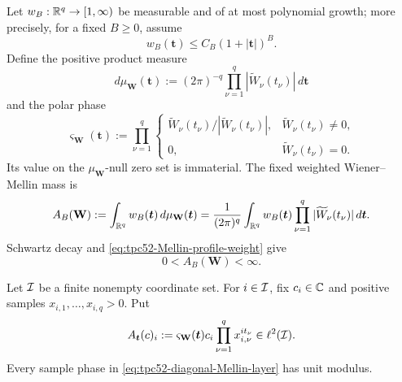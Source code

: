 Let \(w_B:\mathbb R^q\to[1,\infty)\) be measurable and of at most polynomial
growth; more precisely, for a fixed \(B\geq0\), assume
\begin{equation}
 w_B(\bm t)\leq C_B(1+|\bm t|)^B.
 \label{eq:tpc52-Mellin-profile-weight}
\end{equation}
Define the positive product measure
\begin{equation}
 d\mu_{\mathbf W}(\bm t)
 :=(2\pi)^{-q}\prod_{\nu=1}^q
       |\widetilde W_\nu(t_\nu)|\,d\bm t
 \label{eq:tpc52-Mellin-variation-measure}
\end{equation}
and the polar phase
\begin{equation}
 \varsigma_{\mathbf W}(\bm t)
 :=\prod_{\nu=1}^q
   \begin{cases}
    \widetilde W_\nu(t_\nu)/
       |\widetilde W_\nu(t_\nu)|,
       &\widetilde W_\nu(t_\nu)\ne0,\\
    0,&\widetilde W_\nu(t_\nu)=0.
   \end{cases}
 \label{eq:tpc52-Mellin-polar-phase}
\end{equation}
Its value on the \(\mu_{\mathbf W}\)-null zero set is immaterial.  The
fixed weighted Wiener--Mellin mass is
\begin{equation}
 A_B(\mathbf W)
 :=\int_{\mathbb R^q}w_B(\bm t)\,d\mu_{\mathbf W}(\bm t)
 =\frac1{(2\pi)^q}\int_{\mathbb R^q}
   w_B(\bm t)\prod_{\nu=1}^q
   |\widetilde W_\nu(t_\nu)|\,d\bm t.
 \label{eq:tpc52-weighted-Mellin-mass}
\end{equation}
Schwartz decay and \eqref{eq:tpc52-Mellin-profile-weight} give
\begin{equation}
 0<A_B(\mathbf W)<\infty.
 \label{eq:tpc52-Mellin-mass-finite}
\end{equation}

Let \(\mathcal I\) be a finite nonempty coordinate set.  For
\(i\in\mathcal I\), fix \(c_i\in\mathbb C\) and positive samples
\(x_{i,1},\ldots,x_{i,q}>0\).  Put
\begin{equation}
 A_{\bm t}(c)_i
 :=\varsigma_{\mathbf W}(\bm t)c_i
   \prod_{\nu=1}^q x_{i,\nu}^{it_\nu}
 \in\ell^2(\mathcal I).
 \label{eq:tpc52-diagonal-Mellin-layer}
\end{equation}
Every sample phase in \eqref{eq:tpc52-diagonal-Mellin-layer} has unit
modulus.

